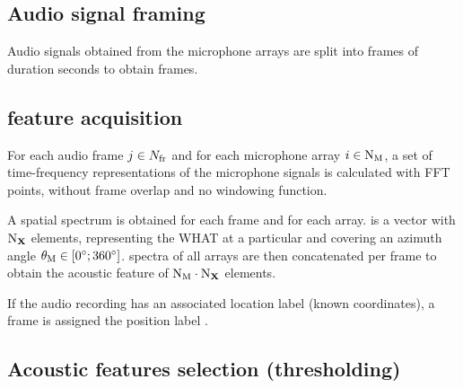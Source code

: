 \documentclass[applsci,article,submit,moreauthors,pdftex]{Definitions/mdpi}
\begin{document}
\subsection{Audio signal framing}
Audio signals obtained from the microphone arrays are split into frames of duration \framedur{} seconds to obtain \Nframes{} frames. 

\subsection{\srpphat{} feature acquisition}
For each audio frame $ j{} \in N_{\mathrm{fr}}{} $ and for each microphone array $ i{} \in \mathrm{N}_{\mathrm{M}} $, a set of time-frequency representations of the microphone signals is calculated with \NFFT{} FFT points, without frame overlap and no windowing function. 

A \srpphat{} spatial spectrum \SRPspectrum{} is obtained for each frame and for each array. 
\SRPspectrum{} is a vector with $ \mathrm{N}_{\mathbf{X}} $ elements, representing the WHAT at a particular \doa{} and covering an azimuth angle $ \theta_{\mathrm{M}} \in [\ang{0};\ang{360}] $.
\srpphat{} spectra of all arrays are then concatenated per frame to obtain the acoustic feature \SRPfeature{} of $ \mathrm{N}_{\mathrm{M}} \cdot \mathrm{N}_{\mathbf{X}} $ elements.

If the audio recording has an associated location label (known coordinates), a frame is assigned the position label \sposlabel{}.

\subsection{Acoustic features selection (thresholding)}
\end{document}
